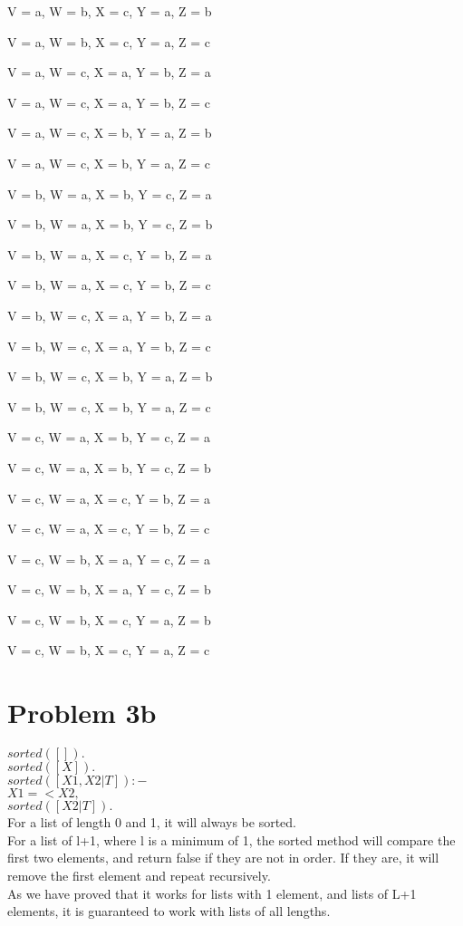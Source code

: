 \documentclass[11pt, oneside]{article}   	%
\begin{document}
V = a,
W = b,
X = c,
Y = a,
Z = b 

V = a,
W = b,
X = c,
Y = a,
Z = c 

V = a,
W = c,
X = a,
Y = b,
Z = a 

V = a,
W = c,
X = a,
Y = b,
Z = c 

V = a,
W = c,
X = b,
Y = a,
Z = b 

V = a,
W = c,
X = b,
Y = a,
Z = c 

V = b,
W = a,
X = b,
Y = c,
Z = a 

V = b,
W = a,
X = b,
Y = c,
Z = b 

V = b,
W = a,
X = c,
Y = b,
Z = a 

V = b,
W = a,
X = c,
Y = b,
Z = c 

V = b,
W = c,
X = a,
Y = b,
Z = a 

V = b,
W = c,
X = a,
Y = b,
Z = c 

V = b,
W = c,
X = b,
Y = a,
Z = b 

V = b,
W = c,
X = b,
Y = a,
Z = c 

V = c,
W = a,
X = b,
Y = c,
Z = a 

V = c,
W = a,
X = b,
Y = c,
Z = b 

V = c,
W = a,
X = c,
Y = b,
Z = a 

V = c,
W = a,
X = c,
Y = b,
Z = c 

V = c,
W = b,
X = a,
Y = c,
Z = a 

V = c,
W = b,
X = a,
Y = c,
Z = b 

V = c,
W = b,
X = c,
Y = a,
Z = b 

V = c,
W = b,
X = c,
Y = a,
Z = c 

\section{Problem 3b}

$sorted([]).$\\
$sorted([X]).$\\

$sorted([X1,X2|T]):-$\\
$X1 =< X2,$\\
$sorted([X2|T]).$\\

For a list of length 0 and 1, it will always be sorted.\\
For a list of l+1, where l is a minimum of 1, the sorted method will compare the first two elements, and return false if they are not in order. If they are, it will remove the first element and repeat recursively.\\
As we have proved that it works for lists with 1 element, and lists of L+1 elements, it is guaranteed to work with lists of all lengths.
\end{document}
